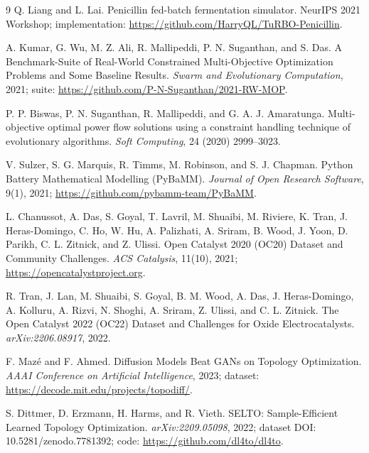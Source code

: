 \documentclass[11pt]{article}
\begin{document}
\begin{thebibliography}{9}
Q. Liang and L. Lai.
\newblock Penicillin fed-batch fermentation simulator.
\newblock NeurIPS 2021 Workshop; implementation: \url{https://github.com/HarryQL/TuRBO-Penicillin}.

A. Kumar, G. Wu, M. Z. Ali, R. Mallipeddi, P. N. Suganthan, and S. Das.
\newblock A Benchmark-Suite of Real-World Constrained Multi-Objective Optimization Problems and Some Baseline Results.
\newblock \emph{Swarm and Evolutionary Computation}, 2021; suite: \url{https://github.com/P-N-Suganthan/2021-RW-MOP}.

P. P. Biswas, P. N. Suganthan, R. Mallipeddi, and G. A. J. Amaratunga.
\newblock Multi-objective optimal power flow solutions using a constraint handling technique of evolutionary algorithms.
\newblock \emph{Soft Computing}, 24 (2020) 2999--3023.

V. Sulzer, S. G. Marquis, R. Timms, M. Robinson, and S. J. Chapman.
\newblock Python Battery Mathematical Modelling (PyBaMM).
\newblock \emph{Journal of Open Research Software}, 9(1), 2021; \url{https://github.com/pybamm-team/PyBaMM}.

L. Chanussot, A. Das, S. Goyal, T. Lavril, M. Shuaibi, M. Riviere, K. Tran, J. Heras-Domingo, C. Ho, W. Hu, A. Palizhati, A. Sriram, B. Wood, J. Yoon, D. Parikh, C. L. Zitnick, and Z. Ulissi.
\newblock Open Catalyst 2020 (OC20) Dataset and Community Challenges.
\newblock \emph{ACS Catalysis}, 11(10), 2021; \url{https://opencatalystproject.org}.

R. Tran, J. Lan, M. Shuaibi, S. Goyal, B. M. Wood, A. Das, J. Heras-Domingo, A. Kolluru, A. Rizvi, N. Shoghi, A. Sriram, Z. Ulissi, and C. L. Zitnick.
\newblock The Open Catalyst 2022 (OC22) Dataset and Challenges for Oxide Electrocatalysts.
\newblock \emph{arXiv:2206.08917}, 2022.

F. Maz\'e and F. Ahmed.
\newblock Diffusion Models Beat GANs on Topology Optimization.
\newblock \emph{AAAI Conference on Artificial Intelligence}, 2023; dataset: \url{https://decode.mit.edu/projects/topodiff/}.

S. Dittmer, D. Erzmann, H. Harms, and R. Vieth.
\newblock SELTO: Sample-Efficient Learned Topology Optimization.
\newblock \emph{arXiv:2209.05098}, 2022; dataset DOI: 10.5281/zenodo.7781392; code: \url{https://github.com/dl4to/dl4to}.


\end{thebibliography}
\end{document}
